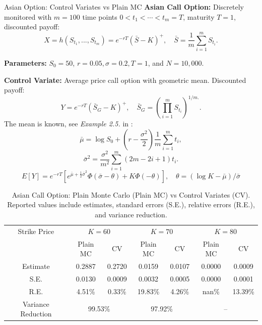 \documentclass[9pt]{beamer}
\begin{document}
\begin{frame}{Asian Option: Control Variates vs Plain MC}
\small
\textbf{Asian Call Option:} Discretely monitored with $m = 100$ time points $0 < t_1 < \cdots < t_m = T$, maturity $T = 1$, discounted payoff:
$$X = h(S_{t_1}, ..., S_{t_m}) = e^{-r T} \left( \bar{S} - K\right)^+, \quad \bar{S} = \frac{1}{m} \sum_{i = 1}^m S_{t_i}. $$

\textbf{Parameters:} $S_0 = 50$, $r = 0.05, \sigma = 0.2, T = 1$, and $N = 10{,}000$.

\textbf{Control Variate:} Average price call option with geometric mean. Discounted payoff:
$$ Y = e^{-rT } (\bar{S}_G - K)^+, \quad \bar{S}_G = \left( \prod_{i = 1}^m S_{t_i} \right)^{1/m.}. $$
The mean is known, see \textit{Example 2.5.} in \cite{textbook}:
$$\bar{\mu} = \log S_0 + (r - \frac{\sigma^2}{2})\frac{1}{m}\sum_{i = 1}^{m}  t_i,$$
$$\bar{\sigma}^2 = \frac{\sigma^2}{m^2} \sum_{i = 1}^{m} (2m - 2i + 1)t_i. $$
$$E[Y] = e^{-rT} [e^{\bar{\mu} + \frac{1}{2} \bar{\sigma}^2} \Phi(\bar{\sigma} - \theta) + K \Phi(-\theta)], \quad \theta = (\log K - \bar{\mu})/\bar{\sigma}$$

\end{frame}

\begin{frame}
\small
\begin{table}[ht]
\centering
\begin{tabular}{c|cc|cc|cc}
\toprule
Strike Price & \multicolumn{2}{c|}{$K = 60$} & \multicolumn{2}{c|}{$K = 70$} & \multicolumn{2}{c}{$K = 80$} \\
 & Plain MC & CV & Plain MC & CV & Plain MC & CV \\
\midrule
Estimate & 0.2887 & 0.2720 & 0.0159 & 0.0107 & 0.0000 & 0.0009 \\
S.E. & 0.0130 & 0.0009 & 0.0032 & 0.0005 & 0.0000 & 0.0001 \\
R.E. & 4.51\% & 0.33\% & 19.83\% & 4.26\% & nan\% & 13.39\% \\
Variance Reduction & \multicolumn{2}{c|}{99.53\%} & \multicolumn{2}{c|}{97.92\%} & \multicolumn{2}{c}{--} \\
\bottomrule
\end{tabular}
\caption{Asian Call Option: Plain Monte Carlo (Plain MC) vs Control Variates (CV). Reported values include estimates, standard errors (S.E.), relative errors (R.E.), and variance reduction.}
\end{table}

\end{frame}
\end{document}
